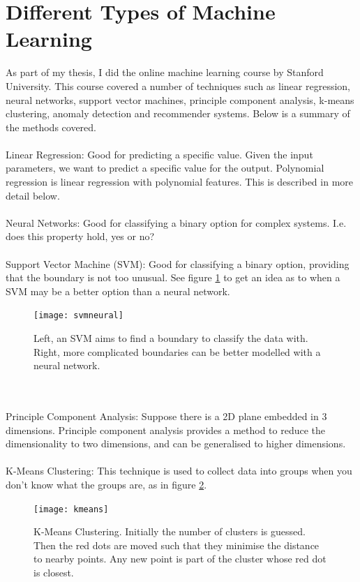 \documentclass[a4paper,12pt]{report}
\begin{document}
\section{Different Types of Machine Learning}
As part of my thesis, I did the online machine learning course by Stanford University. \cite{mooc} This course covered a number of techniques such as linear regression, neural networks, support vector machines, principle component analysis, k-means clustering, anomaly detection and recommender systems. Below is a summary of the methods covered.
\\\\
Linear Regression: Good for predicting a specific value. Given the input parameters, we want to predict a specific value for the output. Polynomial regression is linear regression with polynomial features. This is described in more detail below.
\\\\
Neural Networks: Good for classifying a binary option for complex systems. I.e. does this property hold, yes or no?
\\\\
Support Vector Machine (SVM): Good for classifying a binary option, providing that the boundary is not too unusual. See figure \ref{svmneural} to get an idea as to when a SVM may be a better option than a neural network.
\begin{figure}[h]
\centering
\texttt{[image: svmneural]} 
\caption{Left, an SVM aims to find a boundary to classify the data with. Right, more complicated boundaries can be better modelled with a neural network.}
\label{svmneural} 
\end{figure} 
\\\\
Principle Component Analysis: Suppose there is a 2D plane embedded in 3 dimensions. Principle component analysis provides a method to reduce the dimensionality to two dimensions, and can be generalised to higher dimensions.
\\\\
K-Means Clustering: This technique is used to collect data into groups when you don't know what the groups are, as in figure \ref{kmeans}.
\begin{figure}[h]
\centering
\texttt{[image: kmeans]}
\caption{K-Means Clustering. Initially the number of clusters is guessed. Then the red dots are moved such that they minimise the distance to nearby points. Any new point is part of the cluster whose red dot is closest.}
\label{kmeans} 
\end{figure}
\end{document}
